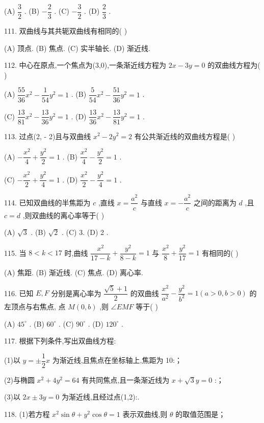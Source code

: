 (A) $\dfrac{3}{2}$ . (B) $- \dfrac{2}{3}$ . (C) $- \dfrac{3}{2}$ . (D) $\dfrac{2}{3}$ .

111. 双曲线与其共轭双曲线有相同的(   )

(A) 顶点. (B) 焦点. (C) 实半轴长. (D) 渐近线.

112. 中心在原点,一个焦点为(3,0),一条渐近线方程为 ${2x} - {3y} = 0$ 的双曲线方程为(   )

(A) $\dfrac{55}{36}{x}^{2} - \dfrac{1}{54}{y}^{2} = 1$ . (B) $\dfrac{5}{54}{x}^{2} - \dfrac{51}{36}{y}^{2} = 1$ .

(C) $\dfrac{13}{81}{x}^{2} - \dfrac{13}{36}{y}^{2} = 1$ . (D) $\dfrac{13}{36}{x}^{2} - \dfrac{13}{81}{y}^{2} = 1$ .

113. 过点(2, - 2)且与双曲线 ${x}^{2} - 2{y}^{2} = 2$ 有公共渐近线的双曲线方程是(   )

(A) $- \dfrac{{x}^{2}}{4} + \dfrac{{y}^{2}}{2} = 1$ . (B) $\dfrac{{x}^{2}}{4} - \dfrac{{y}^{2}}{2} = 1$ .

(C) $- \dfrac{{x}^{2}}{2} + \dfrac{{y}^{2}}{4} = 1$ . (D) $\dfrac{{x}^{2}}{2} - \dfrac{{y}^{2}}{4} = 1$ .

114. 已知双曲线的半焦距为 $c$ ,直线 $x = \dfrac{{a}^{2}}{c}$ 与直线 $x =  - \dfrac{{a}^{2}}{c}$ 之间的距离为 $d$ ,且 $c = d$ ,则双曲线的离心率等于(   )

(A) $\sqrt{3}$ . (B) $\sqrt{2}$ . (C) 3. (D) 2 .

115. 当 $8 < k < {17}$ 时,曲线 $\dfrac{{x}^{2}}{{17} - k} + \dfrac{{y}^{2}}{8 - k} = 1$ 与 $\dfrac{{x}^{2}}{8} + \dfrac{{y}^{2}}{17} = 1$ 有相同的(   )

(A) 焦距. (B) 渐近线. (C) 焦点. (D) 离心率.

116. 已知 $E,F$ 分别是离心率为 $\dfrac{\sqrt{5} + 1}{2}$ 的双曲线 $\dfrac{{x}^{2}}{{a}^{2}} - \dfrac{{y}^{2}}{{b}^{2}} = 1\left( {a > 0,b > 0}\right)$ 的左顶点与右焦点, 点 $M\left( {0,b}\right)$ ,则 $\angle {EMF}$ 等于(   )

(A) ${45}^{ \circ  }$ . (B) ${60}^{ \circ  }$ . (C) ${90}^{ \circ  }$ . (D) ${120}^{ \circ  }$ .

117. 根据下列条件,写出双曲线方程:

(1)以 $y =  \pm  \dfrac{1}{2}x$ 为渐近线,且焦点在坐标轴上,焦距为 10:\blkda{}；

(2)与椭圆 ${x}^{2} + 4{y}^{2} = {64}$ 有共同焦点,且一条渐近线为 $x + \sqrt{3}y = 0$ :\blkda{}；

(3)以 ${2x} \pm  {3y} = 0$ 为渐近线,且经过点(1,2):\blkda{}.

118. (1)若方程 ${x}^{2}\sin \theta  + {y}^{2}\cos \theta  = 1$ 表示双曲线,则 $\theta$ 的取值范围是\blkda{}；

